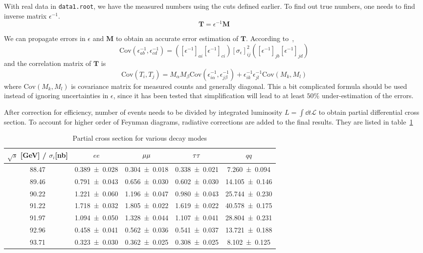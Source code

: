 With real data in \verb|data1.root|, we have the measured numbers using the cuts defined earlier. To find out true numbers, one needs to find inverse matrix $\epsilon^{-1}$.
\begin{equation}
	\mathbf{T} = \epsilon^{-1} \mathbf{M}
\end{equation}

We can propagate errors in $\epsilon$ and $\mathbf{M}$ to obtain an accurate error estimation of $\mathbf{T}$. According to~\cite{Lefebvre:400631},
\begin{equation}
	\text{Cov}(\epsilon^{-1}_{ab}, \epsilon^{-1}_{cd})= ([\epsilon^{-1}]_{a i} [\epsilon^{-1}]_{c i}) [\sigma_{\epsilon}]^2_{ij} ([\epsilon^{-1}]_{j b} [\epsilon^{-1}]_{j d})
\end{equation}
and the correlation matrix of $\mathbf{T}$ is
\begin{equation}
	\text{Cov}(T_i, T_j) = M_\alpha M_\beta \text{Cov} (\epsilon^{-1}_{i\alpha}, \epsilon^{-1}_{j\beta}) + \epsilon^{-1}_{ik} \epsilon^{-1}_{jl} \text{Cov}(M_k, M_l)
	\label{math:CovTT}
\end{equation}
where $\text{Cov}(M_k, M_l)$ is covariance matrix for measured counts and generally diagonal. This a bit complicated formula should be used instead of ignoring uncertainties in $\epsilon$, since it has been tested that simplification will lead to at least $50\%$ under-estimation of the errors.

After correction for efficiency, number of events needs to be divided by integrated luminosity $L = \int\dd{t} \mathcal{L}$ to obtain partial differential cross section. To account for higher order of Feynman diagrams, radiative corrections are added to the final results. They are listed in table~\ref{tab:p_cross}
\begin{table}[ht]
	\centering
	\begin{tabular}{c cccc}
		\toprule
		$\sqrt{s}$ [\si{\giga\eV}] / $\sigma_i$[\si{\nano\barn}] & $ee$ &  $\mu\mu$ &  $\tau\tau$ & $qq$ \\ 
		\midrule 
		\num{88.47} & \num{0.389 +- 0.028} & \num{0.304 +- 0.018} & \num{0.338 +- 0.021} & \num{7.260 +- 0.094}\\
		\num{89.46} & \num{0.791 +- 0.043} & \num{0.656 +- 0.030} & \num{0.602 +- 0.030} & \num{14.105 +- 0.146}\\
		\num{90.22} & \num{1.221 +- 0.060} & \num{1.196 +- 0.047} & \num{0.980 +- 0.043} & \num{25.744 +- 0.230}\\
		\num{91.22} & \num{1.718 +- 0.032} & \num{1.805 +- 0.022} & \num{1.619 +- 0.022} & \num{40.578 +- 0.175}\\
		\num{91.97} & \num{1.094 +- 0.050} & \num{1.328 +- 0.044} & \num{1.107 +- 0.041} & \num{28.804 +- 0.231}\\
		\num{92.96} & \num{0.458 +- 0.041} & \num{0.562 +- 0.036} & \num{0.541 +- 0.037} & \num{13.721 +- 0.188}\\
		\num{93.71} & \num{0.323 +- 0.030} & \num{0.362 +- 0.025} & \num{0.308 +- 0.025} & \num{8.102 +- 0.125}\\
		\bottomrule
	\end{tabular}
	\caption{Partial cross section for various decay modes\label{tab:p_cross}}
\end{table}

